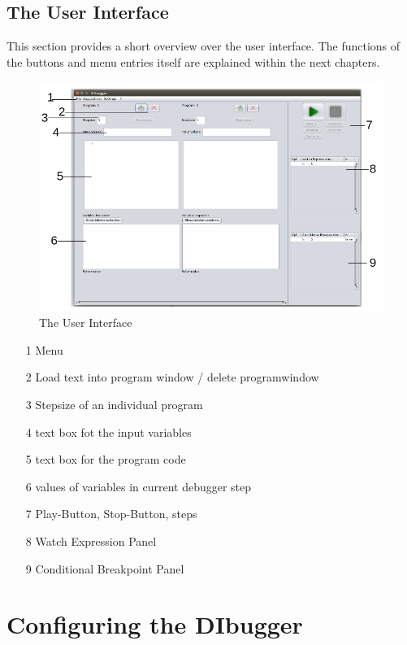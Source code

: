 \documentclass[parskip=full]{memoir}
\begin{document}
\section{The User Interface}
This section provides a short overview over the user interface. The functions of the buttons and menu entries itself are explained within the next chapters.

\newpage

\begin{figure}[!t]
\includegraphics[width=1.0\textwidth]{../Iplementierung/document_data/guiOverview.png}
\caption{The User Interface}
\end{figure}
\begin{itemize}
\item[1] Menu
\item[2] Load text into program window / delete programwindow
\item[3] Stepsize of an individual program
\item[4] text box fot the input variables
\item[5] text box for the program code
\item[6] values of variables in current debugger step
\item[7] Play-Button, Stop-Button, steps
\item[8] Watch Expression Panel
\item[9] Conditional Breakpoint Panel
\end{itemize}



\chapter{Configuring the DIbugger} %
\end{document}
